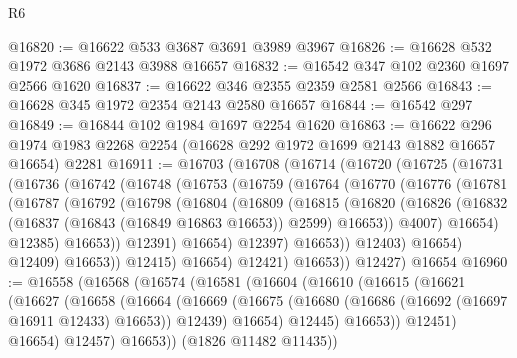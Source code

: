 \begin{lexlean}{R6}
\begin{coremodule}
@16820 := @16622 @533 @3687 @3691 @3989 @3967
@16826 := @16628 @532 @1972 @3686 @2143 @3988 @16657
@16832 := @16542 @347 @102 @2360 @1697 @2566 @1620
@16837 := @16622 @346 @2355 @2359 @2581 @2566
@16843 := @16628 @345 @1972 @2354 @2143 @2580 @16657
@16844 := @16542 @297
@16849 := @16844 @102 @1984 @1697 @2254 @1620
@16863 := @16622
    @296
    @1974
    @1983
    @2268
    @2254
    (@16628 @292 @1972 @1699 @2143 @1882 @16657 @16654)
    @2281
@16911 := @16703
    (@16708
      (@16714
        (@16720
          (@16725
            (@16731
              (@16736
                (@16742
                  (@16748
                    (@16753
                      (@16759
                        (@16764
                          (@16770
                            (@16776
                              (@16781
                                (@16787
                                  (@16792
                                    (@16798
                                      (@16804
                                        (@16809
                                          (@16815
                                            (@16820
                                              (@16826
                                                (@16832
                                                  (@16837 (@16843 (@16849 @16863 @16653)) @2599)
                                                  @16653))
                                              @4007)
                                            @16654)
                                          @12385)
                                        @16653))
                                    @12391)
                                  @16654)
                                @12397)
                              @16653))
                          @12403)
                        @16654)
                      @12409)
                    @16653))
                @12415)
              @16654)
            @12421)
          @16653))
      @12427)
    @16654
@16960 := @16558
    (@16568
      (@16574
        (@16581
          (@16604
            (@16610
              (@16615
                (@16621
                  (@16627
                    (@16658
                      (@16664
                        (@16669
                          (@16675
                            (@16680 (@16686 (@16692 (@16697 @16911 @12433) @16653)) @12439)
                            @16654)
                          @12445)
                        @16653))
                    @12451)
                  @16654)
                @12457)
              @16653))
          (@1826 @11482 @11435))

\end{coremodule}
\end{lexlean}
